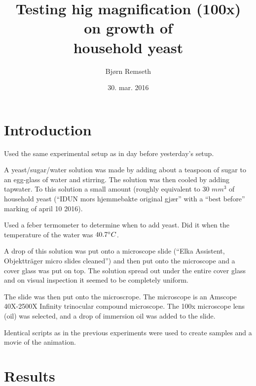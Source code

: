 \documentclass[12pt, a4paper]{article}
\begin{document}
\title{Testing hig magnification (100x) \\ on  growth
  of \\  household yeast}
\author{Bjørn Remseth}
\date{30. mar. 2016}
\maketitle
{}

\section{Introduction}


Used the same experimental setup as in day before yesterday's setup.   

A yeast/sugar/water solution was made by adding about a teaspoon of
sugar to an egg-glass of water and stirring.  The solution was then
cooled by adding tapwater.  To this solution a small amount (roughly
equivalent to 30 \(mm^3\) of household yeast (``IDUN mors hjemmebakte
original gjær'' with a ``best before'' marking of april 10 2016).

Used a feber termometer to determine when to add yeast.  Did it when
the temperature of the water was \(40.7 \degree C\).

A drop of this solution was put onto a microscope slide (``Elka
Assistent, Objektträger micro slides  cleaned'') and then put onto the
microscope and a cover glass was put on top.   The solution spread out
under the entire cover glass and on visual inspection it seemed to be
completely uniform.

The slide was then put onto the microscrope.  The microscope is an
Amscope 40X-2500X Infinity trinocular compound microscope.  The 100x
microscope lens (oil) was selected, and a drop of immersion oil was
added to the slide.


Identical scripts as in the previous experiments were used to create
samples and a movie of the animation.

\section{Results}
\end{document}
